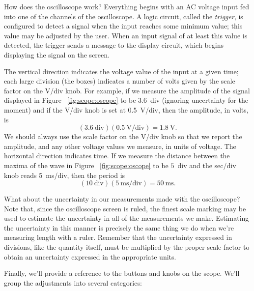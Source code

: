 How does the oscilloscope work? Everything begins with an AC voltage input
fed into one of the channels of the oscilloscope.  A logic circuit, called the
{\it trigger}, is configured to detect a signal when the input reaches some 
minimum value; this value may be adjusted by the user.  When an input signal of
at least this value is detected, the trigger sends a message to the display
circuit, which begins displaying the signal on the screen. 

The vertical direction indicates the voltage value of the input at a given 
time; each large division (the boxes) indicates a number of volts given by the
scale factor on the V/div knob.  For example, if we measure the amplitude of 
the signal displayed in Figure ~\ref{fig:scope:oscope} to be 3.6~div (ignoring 
uncertainty for the moment) and if the V/div knob is set at 0.5~V/div, then 
the amplitude, in volts, is 
$$ (3.6~\mbox{div}) (0.5~\mbox{V/div}) = 1.8~\mbox{V}. $$
We should always use the scale factor on the V/div knob so that we report the 
amplitude, and any other voltage values we measure, in units of voltage.
The horizontal direction indicates time. If we measure the distance between 
the maxima of the wave in Figure ~\ref{fig:scope:oscope} to be $5$~div and 
the sec/div knob reads 5~ms/div, then the period is 
$$(10~\mbox{div}) (5~\mbox{ms/div}) = 50~\mbox{ms}.$$

What about the uncertainty in our measurements made with the oscilloscope? 
Note that, since the oscilloscope screen is ruled, the finest scale marking 
may be used to estimate the uncertainty in all of the measurements we make.  
Estimating the uncertainty in this manner is precisely the same thing we do
when we're measuring length with a ruler. Remember that the uncertainty 
expressed in divisions, like the quantity itself, must be multiplied by the 
proper scale factor to obtain an uncertainty expressed in the appropriate 
units.

Finally, we'll provide a reference to the buttons and knobs on the scope.  
We'll group the adjustments into several categories:


